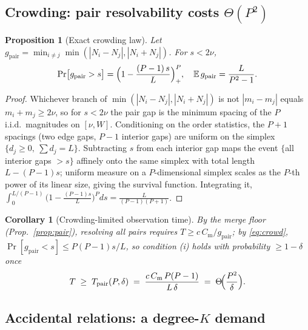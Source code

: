 \documentclass[twocolumn,preprintnumbers,amsmath,amssymb,pra,floatfix]{revtex4-2}
\newtheorem{proposition}{Proposition}
\newtheorem{corollary}{Corollary}
\begin{document}
\subsection{Crowding: pair resolvability costs $\Theta(P^{2})$}

\begin{proposition}[Exact crowding law]
\label{prop:crowd}
Let $g_{\mathrm{pair}}=\min_{i\ne j}\min(|N_i-N_j|,|N_i+N_j|)$.  For
$s<2\nu$,
\begin{equation}
  \Pr\bigl[g_{\mathrm{pair}}>s\bigr]
  =\Bigl(1-\frac{(P-1)\,s}{L}\Bigr)_{+}^{P},
  \quad
  \mathbb{E}\,g_{\mathrm{pair}}=\frac{L}{P^{2}-1}.
  \label{eq:crowd}
\end{equation}
\end{proposition}
\begin{proof}
Whichever branch of $\min(|N_i-N_j|,|N_i+N_j|)$ is not
$|m_i-m_j|$ equals $m_i+m_j\ge2\nu$, so for $s<2\nu$ the pair gap is
the minimum spacing of the $P$ i.i.d.\ magnitudes on $[\nu,W]$.
Conditioning on the order statistics, the $P{+}1$ spacings (two edge
gaps, $P{-}1$ interior gaps) are uniform on the simplex
$\{d_j\ge0,\ \sum d_j=L\}$.  Subtracting $s$ from each interior gap
maps the event $\{$all interior gaps $>s\}$ affinely onto the same
simplex with total length $L-(P-1)s$; uniform measure on a
$P$-dimensional simplex scales as the $P$-th power of its linear
size, giving the survival function.  Integrating it,
$\int_{0}^{L/(P-1)}\!\bigl(1-\tfrac{(P-1)s}{L}\bigr)^{P}ds
=\tfrac{L}{(P-1)(P+1)}$.
\end{proof}

\begin{corollary}[Crowding-limited observation time]
\label{cor:crowdT}
By the merge floor (Prop.~\ref{prop:pair}), resolving all pairs
requires $T\ge c\,C_{\mathrm{m}}/g_{\mathrm{pair}}$; by
\eqref{eq:crowd},
$\Pr[g_{\mathrm{pair}}<s]\le P(P-1)s/L$, so condition (i) holds with
probability $\ge1-\delta$ once
\begin{equation}
  T \;\ge\; T_{\mathrm{pair}}(P,\delta)
  \;=\;\frac{c\,C_{\mathrm{m}}\,P(P-1)}{L\,\delta}
  \;=\;\Theta\!\Bigl(\frac{P^{2}}{\delta}\Bigr).
  \label{eq:crowdT}
\end{equation}
\end{corollary}

\subsection{Accidental relations: a degree-$K$ demand}
\end{document}
